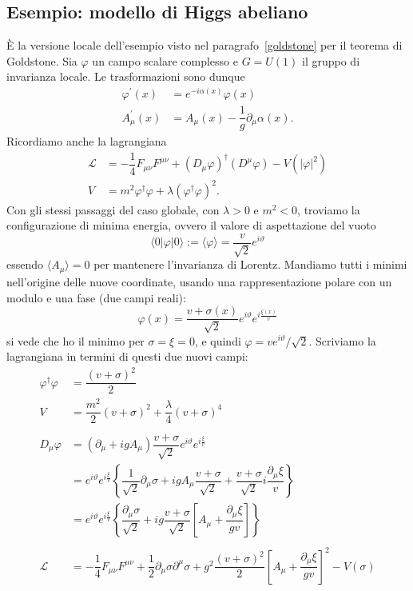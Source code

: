 \documentclass[italian,a4paper]{article}
\theoremstyle{definition}
\newcommand{\lagr}{\ensuremath{\mathscr{L}}}
\newcommand{\dimu}{\ensuremath{\partial_{\mu}}}
\newcommand{\Dimu}{\ensuremath{D_{\mu}}}
\renewcommand{\theta}{\vartheta}
\begin{document}
\subsection*{Esempio: modello di Higgs abeliano}
\`E la versione locale dell'esempio visto nel
paragrafo~\ref{goldstone} per il teorema di Goldstone. Sia $\varphi$ un
campo scalare complesso e $G = U(1)$ il gruppo di invarianza locale. Le
trasformazioni sono dunque
\begin{align*}
    \varphi^\prime(x) &= e^{-i \alpha(x)}\varphi(x)\\
    A_\mu^\prime(x) &= A_\mu(x) - \dfrac{1}{g}\partial_\mu \alpha(x).
\end{align*}
Ricordiamo anche la lagrangiana
\begin{align*}
    \lagr &= -\dfrac{1}{4}F_{\mu\nu}F^{\mu\nu} + (D_\mu\varphi)^\dagger(D^\mu
    \varphi) - V(|\varphi|^2)\\
    V &= m^2 \varphi^\dagger \varphi + \lambda (\varphi^\dagger \varphi)^2.
\end{align*}
Con gli stessi passaggi del caso globale, con $\lambda > 0$ e $m^2 <0$,
troviamo la configurazione di minima energia, ovvero il valore di
aspettazione del vuoto
\begin{equation*}
    \langle 0 \vert \varphi \vert 0 \rangle \mathop:= \langle \varphi
    \rangle = \dfrac{v}{\sqrt{2}}e^{i\theta}
\end{equation*}
essendo $\langle A_\mu \rangle = 0$ per mantenere l'invarianza di Lorentz.
Mandiamo tutti i minimi nell'origine delle nuove coordinate, usando una
rappresentazione polare con un modulo e una fase (due campi reali):
\begin{equation*}
    \varphi(x) = \dfrac{v +
    \sigma(x)}{\sqrt{2}}e^{i\theta}e^{i\frac{\xi(x)}{v}}
\end{equation*}
si vede che ho il minimo per $\sigma = \xi = 0$, e quindi $\varphi =
ve^{i\theta}/\sqrt{2}$. Scriviamo la lagrangiana in termini di questi due
nuovi campi:
\begin{align*}
    \varphi^\dagger \varphi &= \dfrac{(v + \sigma)^2}{2}\\
    V &= \dfrac{m^2}{2}(v + \sigma)^2 + \dfrac{\lambda}{4}(v + \sigma)^4\\
    \\
    \Dimu \varphi &= (\dimu + i g A_{\mu}) \dfrac{v +
    \sigma}{\sqrt{2}}e^{i\theta}e^{i\frac{\xi}{v}}\\
    &= e^{i\theta}e^{i\frac{\xi}{v}}
    \left\{
    \dfrac{1}{\sqrt{2}}\dimu \sigma 
    + i g A_\mu \dfrac{v + \sigma}{\sqrt{2}}
    + \dfrac{v + \sigma}{\sqrt{2}} i\dfrac{\dimu \xi}{v}\right\}\\
    &= e^{i\theta}e^{i\frac{\xi}{v}}
    \left\{
    \dfrac{\dimu \sigma}{\sqrt{2}}
    + i g \dfrac{v + \sigma}{\sqrt{2}} \left[ A_\mu + \dfrac{\dimu \xi}{gv}\right]
    \right\}\\
    \\
    \lagr &= -\dfrac{1}{4}F_{\mu\nu}F^{\mu\nu}
    + \dfrac{1}{2}\partial_\mu \sigma \partial^\mu \sigma
    + g^2 \dfrac{(v + \sigma)^2}{2}\left[ A_{\mu} + \dfrac{\dimu
    \xi}{gv}\right]^2 - V(\sigma)
\end{align*}
\end{document}
